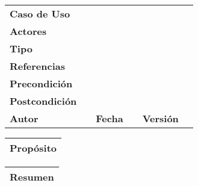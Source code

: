 \begin{table}[H]
\centering
\begin{tabular}{|l|lllll}
\cline{1-1} \cline{6-6}
\textbf{Caso de Uso}   & \textbf{}             & \textbf{}                           & \textbf{}             & \multicolumn{1}{l|}{\textbf{}}        & \multicolumn{1}{l|}{\textbf{}} \\ \cline{1-1} \cline{6-6} 
\textbf{Actores}       &                       &                                     &                       &                                       & \textbf{}                      \\ \cline{1-1}
\textbf{Tipo}          &                       &                                     &                       &                                       & \textbf{}                      \\ \cline{1-1}
\textbf{Referencias}   &                       &                                     &                       &                                       & \textbf{}                      \\ \cline{1-1}
\textbf{Precondición}  &                       &                                     &                       &                                       & \textbf{}                      \\ \cline{1-1}
\textbf{Postcondición} &                       &                                     &                       &                                       &                                \\ \cline{1-1} \cline{3-3} \cline{5-5}
\textbf{Autor}         & \multicolumn{1}{l|}{} & \multicolumn{1}{l|}{\textbf{Fecha}} & \multicolumn{1}{l|}{} & \multicolumn{1}{l|}{\textbf{Versión}} & \textbf{}                      \\ \cline{1-1} \cline{3-3} \cline{5-5}
\end{tabular}
\end{table}

\begin{table}[H]
\centering
\begin{tabular}{l}
\hline
\multicolumn{1}{|l|}{Propósito} \\ \hline
                               
\end{tabular}
\end{table}

\begin{table}[H]
\centering
\begin{tabular}{l}
\hline
\multicolumn{1}{|l|}{Resumen} \\ \hline
                               
\end{tabular}
\end{table}

